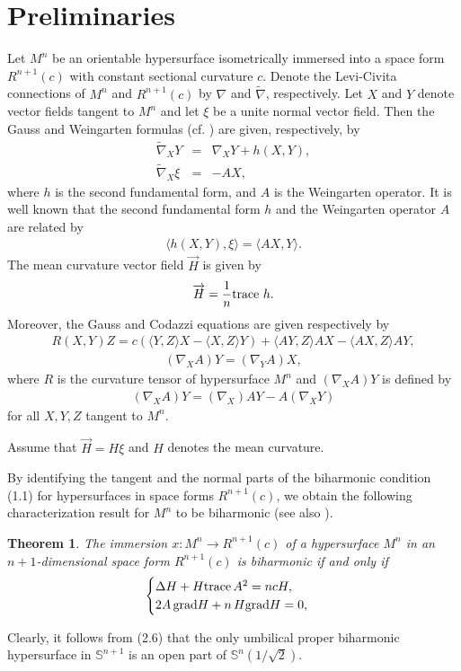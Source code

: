 \documentclass[twoside,reqno,A4]{amsart}
\newtheorem{theorem}{Theorem}[section]
\theoremstyle{definition}
\theoremstyle{remark}
\numberwithin{equation}{section}
\begin{document}
\section{Preliminaries}
Let $M^n$ be an orientable hypersurface isometrically immersed into
a space form $R^{n+1}(c)$ with constant sectional curvature $c$.
Denote the Levi-Civita connections of $M^n$ and $R^{n+1}(c)$ by
$\nabla$ and $\tilde\nabla$, respectively. Let $X$ and $Y$ denote
vector fields tangent to $M^n$ and let $\xi$ be a unite normal
vector field. Then the Gauss and Weingarten formulas (cf.
\cite{chenbook2011, chenbook1984}) are given, respectively, by
\begin{eqnarray}
\tilde\nabla_XY&=&\nabla_XY+h(X,Y),\label{l23}\\
\tilde\nabla_X\xi&=&-AX,\label{l16}
\end{eqnarray}
where $h$ is the second fundamental form, and $A$ is the Weingarten
operator. It is well known that the second fundamental form $h$ and
the Weingarten operator $A$ are related by
\begin{eqnarray}\label{l3}
\langle h(X,Y),\xi\rangle=\langle AX,Y\rangle.
\end{eqnarray}
The mean curvature vector field $\overrightarrow{H}$ is given by
\begin{eqnarray}
\overrightarrow{H}=\frac{1}{n}{\rm trace}~h.
\end{eqnarray}
Moreover, the Gauss and Codazzi equations are given respectively by
\begin{eqnarray*}
R(X,Y)Z=c(\langle Y, Z\rangle X-\langle X,Z\rangle Y)+\langle
AY,Z\rangle AX-\langle AX,Z\rangle AY,
\end{eqnarray*}
\begin{eqnarray*}
(\nabla_{X} A)Y=(\nabla_{Y} A)X,
\end{eqnarray*}
where $R$ is the curvature tensor of hypersurface $M^n$ and
$(\nabla_XA)Y$ is defined by
\begin{eqnarray}\label{l7}
(\nabla_XA)Y=(\nabla_X)AY-A(\nabla_XY)
\end{eqnarray}
for all $X, Y, Z$ tangent to $M^n$.

Assume that $\overrightarrow{H}=H\xi$ and $H$ denotes the mean
curvature.

By identifying the tangent and the normal parts of the biharmonic
condition (1.1) for hypersurfaces in space forms $R^{n+1}(c)$, we
obtain the following characterization result for $M^n$ to be
biharmonic (see also \cite{CMO2002, BMO20102, chenbook1984}).
\begin{theorem}
The immersion $x: M^n\rightarrow R^{n+1}(c)$ of a hypersurface $M^n$
in an $n+1$-dimensional space form $R^{n+1}(c)$ is biharmonic if and
only if
\begin{equation}
\begin{cases}
\Delta H+H {\rm trace}\, A^2 =ncH,\\
2A\,{\rm grad}H+n\, H{\rm grad}H=0,
\end{cases}
\end{equation}
\end{theorem}
Clearly, it follows from (2.6) that the only umbilical proper
biharmonic hypersurface in $\mathbb S^{n+1}$ is an open part of
$\mathbb S^n(1/\sqrt2)$.
\end{document}
